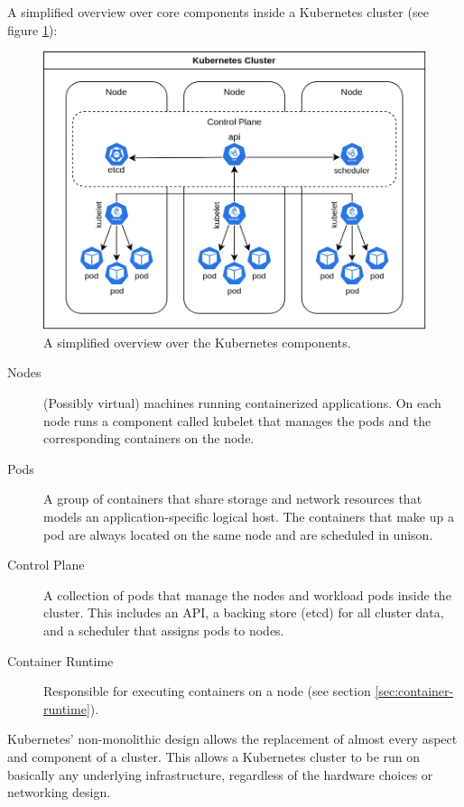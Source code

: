 A simplified overview over core components inside a Kubernetes cluster (see
figure \ref{fig:kubernetes-overview}):

\begin{figure}
  \centering
  \includegraphics[width=0.8\linewidth]{resources/kubernetes-overview.png}
  \caption{A simplified overview over the Kubernetes components.}
  \label{fig:kubernetes-overview}
\end{figure}

\begin{description}
  \item[Nodes]
    (Possibly virtual) machines running containerized applications. On each node
    runs a component called kubelet that manages the pods and the corresponding
    containers on the node.
  \item[Pods]
    A group of containers that share storage and network resources that models
    an application-specific logical host. The containers that make up a pod are
    always located on the same node and are scheduled in unison.
  \item[Control Plane]
    A collection of pods that manage the nodes and workload pods inside the
    cluster. This includes an API, a backing store (etcd) for all cluster data,
    and a scheduler that assigns pods to nodes.
  \item[Container Runtime]
    Responsible for executing containers on a node (see section
    \ref{sec:container-runtime}).
\end{description}


Kubernetes' non-monolithic design allows the replacement of almost every aspect
and component of a cluster. This allows a Kubernetes cluster to be run on
basically any underlying infrastructure, regardless of the hardware choices or
networking design.

